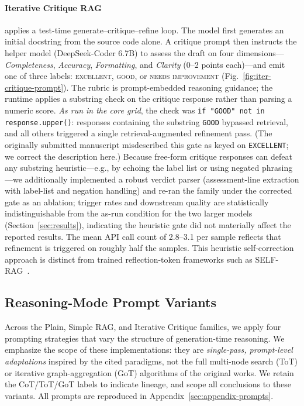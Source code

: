 \documentclass[pdflatex,sn-mathphys-ay]{sn-jnl}%
\theoremstyle{thmstyleone}%
\theoremstyle{thmstyletwo}%
\theoremstyle{thmstylethree}%
\begin{document}
\paragraph{Iterative Critique RAG} applies a test-time generate--critique--refine loop. The model first generates an initial docstring from the source code alone. A critique prompt then instructs the helper model (DeepSeek-Coder 6.7B) to assess the draft on four dimensions---\textit{Completeness}, \textit{Accuracy}, \textit{Formatting}, and \textit{Clarity} (0--2 points each)---and emit one of three labels: \textsc{excellent}, \textsc{good}, or \textsc{needs improvement} (Fig.~\ref{fig:iter-critique-prompt}). {\color{blue}
The rubric is prompt-embedded reasoning guidance; the runtime applies a substring check on the critique response rather than parsing a numeric score. \emph{As run in the core grid}, the check was \texttt{if "GOOD" not in response.upper()}: responses containing the substring \texttt{GOOD} bypassed retrieval, and all others triggered a single retrieval-augmented refinement pass. (The originally submitted manuscript misdescribed this gate as keyed on \texttt{EXCELLENT}; we correct the description here.) Because free-form critique responses can defeat any substring heuristic---e.g., by echoing the label list or using negated phrasing---we additionally implemented a robust verdict parser (assessment-line extraction with label-list and negation handling) and re-ran the family under the corrected gate as an ablation; trigger rates and downstream quality are statistically indistinguishable from the as-run condition for the two larger models (Section~\ref{sec:results}), indicating the heuristic gate did not materially affect the reported results.
}
 The mean API call count of 2.8--3.1 per sample reflects that refinement is triggered on roughly half the samples. This heuristic self-correction approach is distinct from trained reflection-token frameworks such as SELF-RAG~\citep{Asai2023SelfRAGLT}.

\subsection{Reasoning-Mode Prompt Variants}
\label{sec:reasoning-modes}
Across the Plain, Simple RAG, and Iterative Critique families, we apply four prompting strategies that vary the structure of generation-time reasoning. {\color{blue}
We emphasize the scope of these implementations: they are \emph{single-pass, prompt-level adaptations} inspired by the cited paradigms, not the full multi-node search (ToT) or iterative graph-aggregation (GoT) algorithms of the original works. We retain the CoT/ToT/GoT labels to indicate lineage, and scope all conclusions to these variants. All prompts are reproduced in Appendix~\ref{sec:appendix-prompts}.
}
\end{document}
